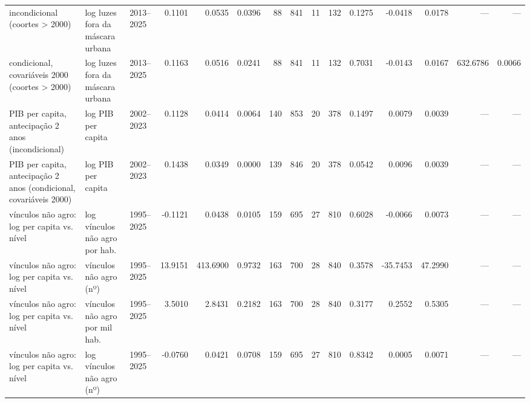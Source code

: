 \begin{table}
\begin{tabular}{lllrrrrrrrrrrrr}
incondicional (coortes > 2000) & log luzes fora da máscara urbana & 2013–2025 & 0.1101 & 0.0535 & 0.0396 & 88 & 841 & 11 & 132 & 0.1275 & -0.0418 & 0.0178 & — & — \\
condicional, covariáveis 2000 (coortes > 2000) & log luzes fora da máscara urbana & 2013–2025 & 0.1163 & 0.0516 & 0.0241 & 88 & 841 & 11 & 132 & 0.7031 & -0.0143 & 0.0167 & 632.6786 & 0.0066 \\
PIB per capita, antecipação 2 anos (incondicional) & log PIB per capita & 2002–2023 & 0.1128 & 0.0414 & 0.0064 & 140 & 853 & 20 & 378 & 0.1497 & 0.0079 & 0.0039 & — & — \\
PIB per capita, antecipação 2 anos (condicional, covariáveis 2000) & log PIB per capita & 2002–2023 & 0.1438 & 0.0349 & 0.0000 & 139 & 846 & 20 & 378 & 0.0542 & 0.0096 & 0.0039 & — & — \\
vínculos não agro: log per capita vs. nível & log vínculos não agro por hab. & 1995–2025 & -0.1121 & 0.0438 & 0.0105 & 159 & 695 & 27 & 810 & 0.6028 & -0.0066 & 0.0073 & — & — \\
vínculos não agro: log per capita vs. nível & vínculos não agro (nº) & 1995–2025 & 13.9151 & 413.6900 & 0.9732 & 163 & 700 & 28 & 840 & 0.3578 & -35.7453 & 47.2990 & — & — \\
vínculos não agro: log per capita vs. nível & vínculos não agro por mil hab. & 1995–2025 & 3.5010 & 2.8431 & 0.2182 & 163 & 700 & 28 & 840 & 0.3177 & 0.2552 & 0.5305 & — & — \\
vínculos não agro: log per capita vs. nível & log vínculos não agro (nº) & 1995–2025 & -0.0760 & 0.0421 & 0.0708 & 159 & 695 & 27 & 810 & 0.8342 & 0.0005 & 0.0071 & — & — \\
\bottomrule
\end{tabular}
\end{table}
